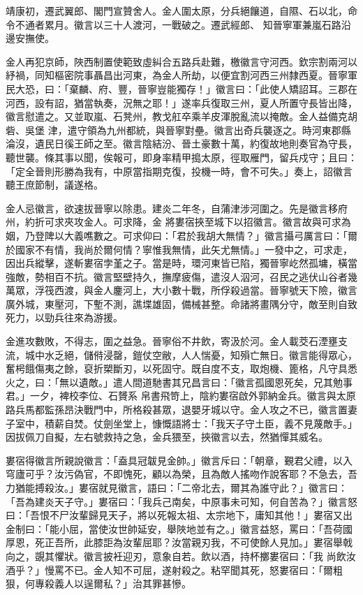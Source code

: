 \begin{pinyinscope}
 靖康初，遷武翼郎、閣門宣贊舍人。金人圍太原，分兵絕饟道，自隰、石以北，命令不通者累月。徽言以三十人渡河，一戰破之。遷武經郎、
 知晉寧軍兼嵐石路沿邊安撫使。



 金人再犯京師，陜西制置使範致虛糾合五路兵赴難，檄徽言守河西。欽宗割兩河以紓禍，同知樞密院事聶昌出河東，為金人所劫，以便宜割河西三州隸西夏。晉寧軍民大恐，曰：「棄麟、府、豐，晉寧豈能獨存！」徽言曰：「此使人矯詔耳。三郡在河西，設有詔，猶當執奏，況無之耶！」遂率兵復取三州，夏人所置守長皆出降，徽言慰遣之。又並取嵐、石凳州，教戈舡卒乘羊皮渾脫亂流以掩敵。金人益備克胡砦、吳堡
 津，遣守領為九州都統，與晉寧對壘。徽言出奇兵襲逐之。時河東郡縣淪沒，遺民日徯王師之至。徽言陰結汾、晉土豪數十萬，約復故地則奏官為守長，聽世襲。條其事以聞，俟報可，即身率精甲搗太原，徑取雁門，留兵戍守；且曰：「定全晉則形勝為我有，中原當指期克復，投機一時，會不可失。」奏上，詔徽言聽王庶節制，議遂格。



 金人忌徽言，欲速拔晉寧以除患。建炎二年冬，自蒲津涉河圍之。先是徽言移府州，約折可求夾攻金人。可求降，金
 將婁宿挾至城下以招徽言。徽言故與可求為姻，乃登陴以大義噍數之。可求仰曰：「君於我胡大無情？」徽言攝弓厲言曰：「爾於國家不有情，我尚於爾何情？寧惟我無情，此矢尤無情。」一發中之，可求走，因出兵縱擊，遂斬婁宿孛堇之子。當是時，環河東皆已陷，獨晉寧屹然孤墉，橫當強敵，勢相百不抗。徽言堅壁持久，撫摩疲傷，遣沒人泅河，召民之逃伏山谷者幾萬眾，浮筏西渡，與金人鏖河上，大小數十戰，所俘殺過當。晉寧號天下險，徽言
 廣外城，東壓河，下塹不測，譙堞雄固，備械甚整。命諸將畫隅分守，敵至則自致死力，以勁兵往來為游援。



 金進攻數敗，不得志，圍之益急。晉寧俗不井飲，寄汲於河。金人載茭石湮壅支流，城中水乏絕，儲偫浸罄，鎧仗空敝，人人惴憂，知殞亡無日。徽言能得眾心，奮枵餓傷夷之餘，裒折槊斷刃，以死固守。既自度不支，取炮機、篦格，凡守具悉火之，曰：「無以遺敵。」遣人間道馳書其兄昌言曰：「徽言孤國恩死矣，兄其勉事君。」一夕，裨校李位、石贇系
 帛書飛笴上，陰約婁宿啟外郭納金兵。徽言與太原路兵馬都監孫昂決戰門中，所格殺甚眾，退嬰牙城以守。金人攻之不已，徽言置妻子室中，積薪自焚。仗劍坐堂上，慷慨語將士：「我天子守土臣，義不見蔑敵手。」因拔佩刀自擬，左右號救持之急，金兵猥至，挾徽言以去，然猶憚其威名。



 婁宿得徽言所親說徽言：「盍具冠韍見金帥。」徽言斥曰：「朝章，覲君父禮，以入穹廬可乎？汝污偽官，不即愧死，顧以為榮，且為敵人搖吻作說客耶？不急去，吾
 力猶能搏殺汝。」婁宿就見徽言，語曰：「二帝北去，爾其為誰守此？」徽言曰：「吾為建炎天子守。」婁宿曰：「我兵己南矣，中原事未可知，何自苦為？」徽言怒曰：「吾恨不尸汝輩歸見天子，將以死報太祖、太宗地下，庸知其他！」婁宿又出金制曰：「能小屈，當使汝世帥延安，舉陜地並有之。」徽言益怒，罵曰：「吾荷國厚恩，死正吾所，此膝詎為汝輩屈耶？汝當親刃我，不可使餘人見加。」婁宿舉戟向之，覬其懼狀。徽言披衽迎刃，意象自若。飲以酒，持杯擲婁宿曰：「我
 尚飲汝酒乎？」慢罵不已。金人知不可屈，遂射殺之。粘罕聞其死，怒婁宿曰：「爾粗狠，何專殺義人以逞爾私？」治其罪甚慘。




\end{pinyinscope}
